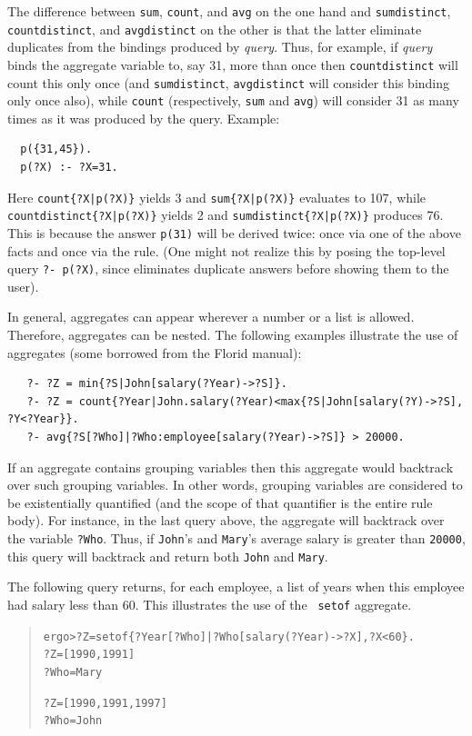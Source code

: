 \documentclass[11pt]{article}
\newcommand{\ERGO}{\mbox{\smaller{\ensuremath{\cal{E}}\smaller{{\sc{RGO}}}}}\xspace}
\newcommand{\FLSYSTEM}{\ERGO}
\newcommand{\prompt}{ergo> }
\newcommand{\FLORID}{{\mbox{\sc Florid}}\xspace}
\begin{document}
The difference between \texttt{sum}, \texttt{count}, and \texttt{avg} on
the one hand and \texttt{sumdistinct}, \texttt{countdistinct}, and
\texttt{avgdistinct} on the other is that the latter eliminate duplicates
from the bindings produced by \textit{query}. Thus, for example, if
\textit{query} binds the aggregate variable to, say 31, more than once then
\texttt{countdistinct} will count this only once (and \texttt{sumdistinct},
\texttt{avgdistinct} will consider this binding only once also), while   
\texttt{count} (respectively, \texttt{sum} and \texttt{avg}) will consider    
31 as many times as it was produced by the query. Example:
\begin{verbatim}
  p({31,45}).
  p(?X) :- ?X=31.
\end{verbatim}
Here \texttt{count\{?X|p(?X)\}} yields 3 and \texttt{sum\{?X|p(?X)\}}
evaluates to 107, while \texttt{countdistinct\{?X|p(?X)\}} yields 2 and
\texttt{sumdistinct\{?X|p(?X)\}} produces 76.  This is because the answer
\texttt{p(31)} will be derived twice: once via one of the above facts and
once via the rule. (One might not realize this by posing the top-level
query \texttt{?- p(?X)}, since \FLSYSTEM eliminates duplicate answers
before showing them to the user).

In general, aggregates can appear wherever a number or a list is
allowed. Therefore, aggregates can be nested. The following examples
illustrate the use of aggregates (some borrowed from the \FLORID manual):
\begin{verbatim}
   ?- ?Z = min{?S|John[salary(?Year)->?S]}.
   ?- ?Z = count{?Year|John.salary(?Year)<max{?S|John[salary(?Y)->?S], ?Y<?Year}}.
   ?- avg{?S[?Who]|?Who:employee[salary(?Year)->?S]} > 20000. 
\end{verbatim}
If an aggregate contains grouping variables 
then this aggregate would backtrack over such
grouping variables. In other words, grouping variables are considered to be
existentially quantified (and the scope of that quantifier is
the entire rule body).
For instance, in the last query above, the
aggregate will backtrack over the variable {\tt ?Who}. Thus, if
{\tt John}'s and {\tt Mary}'s average salary is greater than {\tt 20000},
this query will backtrack and return both {\tt John} and {\tt Mary}.

The following query returns, for each employee, a list of years when this
employee had salary less than 60. This illustrates the use of the {\tt
  setof} aggregate.
\begin{quote}
\begin{alltt}
\prompt ?Z = setof\{?Year[?Who]|?Who[salary(?Year)->?X], ?X < 60\}.
?Z = [1990,1991]
?Who = Mary

?Z = [1990,1991,1997]
?Who = John
\end{alltt}
\end{quote}
\end{document}
